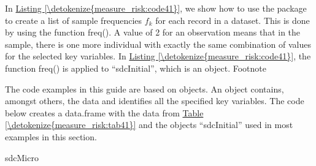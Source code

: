 \documentclass[letterpaper,10pt,english]{sphinxmanual}
\begin{document}
In \hyperref[\detokenize{measure_risk:code41}]{Listing \ref{\detokenize{measure_risk:code41}}}, we show how to use the  package to create a
list of sample frequencies \(f_{k}\) for each record in a dataset.
This is done by using the  function freq(). A value of 2 for
an observation means that in the sample, there is one more individual
with exactly the same combination of values for the selected key
variables. In \hyperref[\detokenize{measure_risk:code41}]{Listing \ref{\detokenize{measure_risk:code41}}}, the function freq() is applied to
“sdcInitial”, which is an  object. Footnote %
\begin{footnote}[5]\sphinxAtStartFootnote
The code examples in this guide are based on  objects. An
 object contains, amongst others, the data and identifies
all the specified key variables. The code below creates a data.frame
with the data from \hyperref[\detokenize{measure_risk:tab41}]{Table \ref{\detokenize{measure_risk:tab41}}} and the  objects “sdcInitial”
used in most examples in this section.

\sphinxSetupCodeBlockInFootnote
{}%
\begin{sphinxVerbatim}[commandchars=\\\{\}]
sdcMicro



\end{sphinxVerbatim}
\end{footnote}
\end{document}
